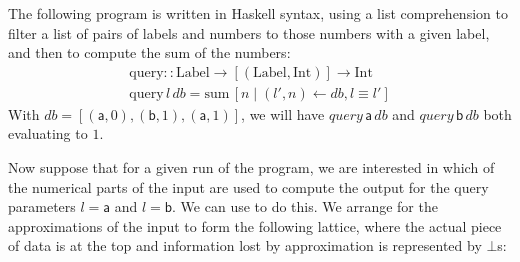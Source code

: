 \begin{example}
  The following program is written in Haskell \cite{haskell} syntax, using a list comprehension to filter a list of pairs of labels and numbers to those numbers with a given label, and then to compute the sum of the numbers:
  \begin{displaymath}
    \begin{array}{l}
      \mathrm{query} :: \mathrm{Label} \to [(\mathrm{Label}, \mathrm{Int})] \to \mathrm{Int} \\
      \mathrm{query}\,l\,\mathit{db} = \mathrm{sum}\,[ n \mid (l',n) \leftarrow \mathit{db}, l \equiv l' ]
    \end{array}
  \end{displaymath}
  With $\mathit{db} = [(\mathsf{a}, 0), (\mathsf{b}, 1), (\mathsf{a}, 1)]$, we will have $\mathit{query}\,\mathsf{a}\,\mathit{db}$ and $\mathit{query}\,\mathsf{b}\,\mathit{db}$ both evaluating to $1$.

  Now suppose that for a given run of the program, we are interested in which of the numerical parts of the input are used to compute the output for the query parameters $l = \mathsf{a}$ and $l = \mathsf{b}$. We can use \GPS to do this. We arrange for the approximations of the input to form the following lattice, where the actual piece of data is at the top and information lost by approximation is represented by $\bot$s:
  \begin{center}
\end{center}
\end{example}
